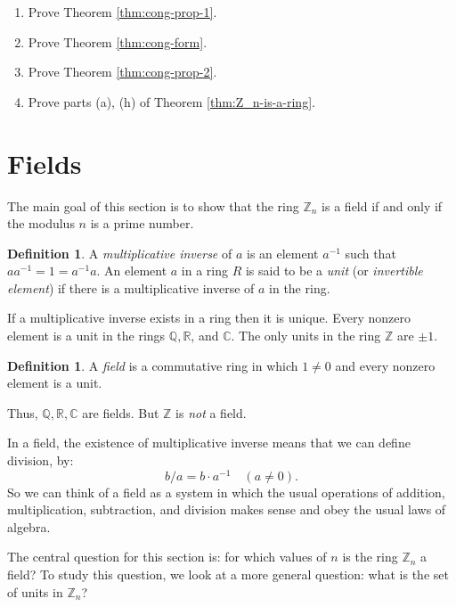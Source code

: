 \documentclass[11pt]{article}
\newenvironment{problems}
{
 \begin{enumerate}[topsep=1pt,itemsep=0pt,parsep=2pt,leftmargin=0.6cm,%
 label={\arabic*.}, ref=\arabic*] \small
}
{
 \end{enumerate}
}
\theoremstyle{definition}
\newtheorem{defn}[thm]{Definition}
\newcommand{\R}{\mathbb{R}} %
\newcommand{\C}{\mathbb{C}} %
\newcommand{\Z}{\mathbb{Z}} %
\newcommand{\Q}{\mathbb{Q}} %
\begin{document}
\begin{problems}
\item Prove Theorem \ref{thm:cong-prop-1}.

\item Prove Theorem \ref{thm:cong-form}.

\item Prove Theorem \ref{thm:cong-prop-2}.

\item Prove parts (a), (h) of Theorem \ref{thm:Z_n-is-a-ring}.


\end{problems}




\newpage\section{Fields}\noindent
The main goal of this section is to show that the ring $\Z_n$ is a
field if and only if the modulus $n$ is a prime number.

\begin{defn}
  A \emph{multiplicative inverse} of $a$ is an element
  $a^{-1}$ such that $a a^{-1} = 1 = a^{-1} a$.  An element $a$ in a
  ring $R$ is said to be a \emph{unit} (or
  \emph{invertible element}) if there is a multiplicative inverse of
  $a$ in the ring.
\end{defn}

If a multiplicative inverse exists in a ring then it is unique.  Every
nonzero element is a unit in the rings $\Q, \R$, and $\C$. The only
units in the ring $\Z$ are $\pm 1$.

\begin{defn}
  A \emph{field} is a commutative ring in which $1 \ne 0$ and every
  nonzero element is a unit.
\end{defn}

Thus, $\Q, \R, \C$ are fields. But $\Z$ is \emph{not} a field. 

In a field, the existence of multiplicative inverse means that we can
define division, by:
\[
  b/a = b \cdot a^{-1} \quad (a \ne 0).
\]
So we can think of a field as a system in which the usual operations
of addition, multiplication, subtraction, and division makes sense
and obey the usual laws of algebra.



The central question for this section is: for which values of $n$ is
the ring $\Z_n$ a field? To study this question, we look at a more
general question: what is the set of units in $\Z_n$?
\end{document}
